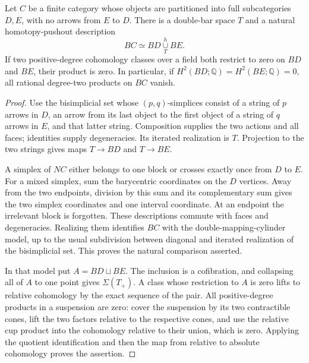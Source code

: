 \begin{lemma}
\label{CP2:A-two-block}
Let $C$ be a finite category whose objects are partitioned into full
subcategories $D,E$, with no arrows from $E$ to $D$. There is a
double-bar space $T$ and a natural homotopy-pushout description
\[
 BC\simeq BD\mathop{\cup}\limits_T^h BE.
\]
If two positive-degree cohomology classes over a field both restrict
to zero on $BD$ and $BE$, their product is zero. In particular, if
$H^2(BD;\mathbb Q)=H^2(BE;\mathbb Q)=0$, all rational degree-two
products on $BC$ vanish.
\end{lemma}
\begin{proof}
Use the bisimplicial set whose $(p,q)$-simplices consist of a string
of $p$ arrows in $D$, an arrow from its last object to the first
object of a string of $q$ arrows in $E$, and that latter string.
Composition supplies the two actions and all faces; identities supply
degeneracies. Its iterated realization is $T$. Projection to the two
strings gives maps $T\to BD$ and $T\to BE$.

A simplex of $NC$ either belongs to one block or crosses exactly once
from $D$ to $E$. For a mixed simplex, sum the barycentric coordinates
on the $D$ vertices. Away from the two endpoints, division by this
sum and its complementary sum gives the two simplex coordinates and
one interval coordinate. At an endpoint the irrelevant block is
forgotten. These descriptions commute with faces and degeneracies.
Realizing them identifies $BC$ with the double-mapping-cylinder model,
up to the usual subdivision between diagonal and iterated realization
of the bisimplicial set. This proves the natural comparison asserted.

In that model put $A=BD\sqcup BE$. The inclusion is a cofibration, and
collapsing all of $A$ to one point gives $\Sigma(T_+)$. A class whose
restriction to $A$ is zero lifts to relative cohomology by the exact
sequence of the pair. All positive-degree products in a suspension
are zero: cover the suspension by its two contractible cones, lift
the two factors relative to the respective cones, and use the
relative cup product into the cohomology relative to their union,
which is zero. Applying the quotient identification and then the map
from relative to absolute cohomology proves the assertion.
\end{proof}

